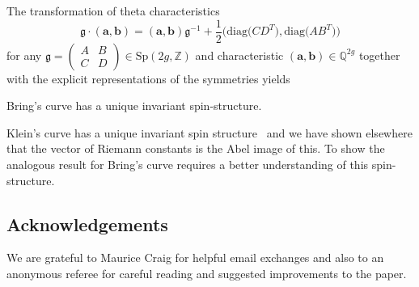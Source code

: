 \documentclass[pdftex]{sigma}
\numberwithin{equation}{section}
\begin{document}
The transformation of theta characteristics
\[
\mathfrak{g}\cdot(\boldsymbol{a},\boldsymbol{b})=
(\boldsymbol{a},\boldsymbol{b})\mathfrak{g}^{-1}
+\frac12\big(\mathrm{diag}\big(CD^T\big),\mathrm{diag}\big(AB^T\big) \big)
\]
for any $\mathfrak{g}=\left(\begin{array}{cc}A&B\\C&D
\end{array}\right)\in\mathrm{Sp}(2g,\mathbb{Z})$ and characteristic
$(\boldsymbol{a},\boldsymbol{b})\in\mathbb{Q}^{2g}$ together with
the explicit representations of the symmetries yields
\begin{theorem}
Bring's curve has a unique invariant spin-structure.
\end{theorem}

\begin{remark} Klein's curve has a unique invariant spin structure~\cite{ks10}
and we have shown elsewhere that the vector of Riemann constants is the Abel image of this.
To show the analogous result for Bring's curve requires a better understanding of this
spin-structure.
\end{remark}


\subsection*{Acknowledgements}

We are grateful to Maurice Craig for helpful email exchanges and also to
an anonymous referee for careful reading and suggested improvements to the paper.
\end{document}
